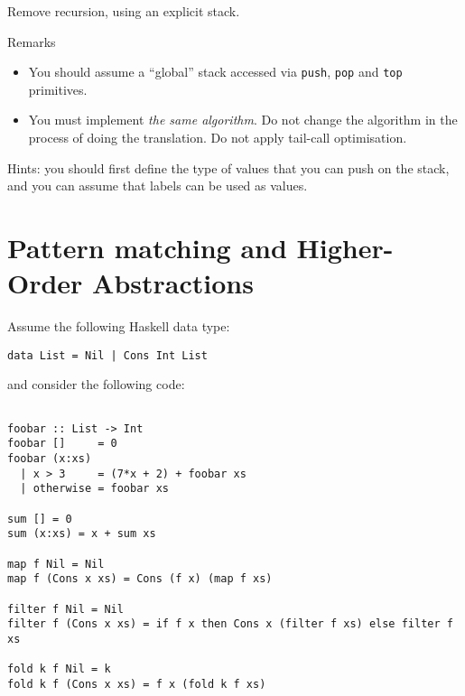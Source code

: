 \documentclass{article}
\newcommand{\answer}[1]{}
\begin{document}
Remove recursion, using an explicit stack. 

Remarks

\begin{itemize}
\item  You should assume a ``global'' stack accessed via \texttt{push},
  \texttt{pop} and \texttt{top} primitives.

\item You must implement \emph{the same algorithm}. Do not change the
  algorithm in the process of doing the translation. Do not apply
  tail-call optimisation.
\end{itemize}

Hints: you should first define the type of values that you can push on
the stack, and you can assume that labels can be used as values.

\answer{
  \begin{verbatim}
    
Stack frame: (n:Int,tmp:Int,caller:Pointer)

fib:
  if top.n == 0
     result = 0;
     goto top.caller
  else if top.n == 1
     result = 1
     goto top.caller
  else
     push (n-1,X,ret1)
     goto fib
ret1:
     pop;
     top.tmp = result;
     push (n-2,X,ret2);
     goto fib;
ret2:
     pop;
     result := result + top.tmp;
     goto top.caller;  
  \end{verbatim}
}


\newpage
\section{Pattern matching and Higher-Order Abstractions}

Assume the following Haskell data type:
\begin{verbatim}
data List = Nil | Cons Int List
\end{verbatim}
and consider the following code:
\begin{verbatim}

foobar :: List -> Int
foobar []     = 0
foobar (x:xs)
  | x > 3     = (7*x + 2) + foobar xs
  | otherwise = foobar xs

sum [] = 0
sum (x:xs) = x + sum xs

map f Nil = Nil
map f (Cons x xs) = Cons (f x) (map f xs)

filter f Nil = Nil
filter f (Cons x xs) = if f x then Cons x (filter f xs) else filter f xs

fold k f Nil = k
fold k f (Cons x xs) = f x (fold k f xs)
\end{verbatim}
\end{document}
